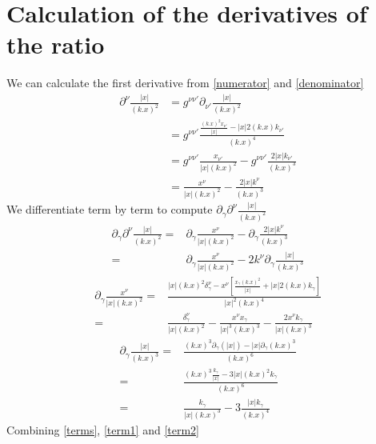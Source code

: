 \documentclass[10pt,a4paper]{article}
\begin{document}
	\section{Calculation of the derivatives of the ratio}
	We can calculate the first derivative from \ref{numerator} and  \ref{denominator}
	\begin{align}
	\partial^{\nu}\frac{\lvert x \rvert}{(k.x)^2} &=g^{\nu\nu'}\partial_{\nu'}\frac{\lvert x \rvert}{(k.x)^2}\\
	&=g^{\nu\nu'}\frac{\frac{(k.x)^{2}x_{\nu'}}{\lvert x \rvert}
		-\lvert x \rvert 2 (k.x)k_{\nu'}}{(k.x)^{4}} \\
	&= g^{\nu\nu'}\frac{x_{\nu'}}{\lvert x \rvert (k.x)^{2}} - g^{\nu\nu'}\frac{2\lvert x \rvert k_{\nu'}}{(k.x)^3} \\
	&= \frac{x^{\nu}}{\lvert x \rvert (k.x)^{2}} - \frac{2\lvert x \rvert k^{\nu}}{(k.x)^3}
	\end{align}
	We differentiate term by term to compute $\partial_{\gamma}\partial^{\nu}\frac{\lvert x \rvert}{(k.x)^{2}}$
	\begin{align}
	\partial_{\gamma}\partial^{\nu}\frac{\lvert x \rvert}{(k.x)^{2}} =&\partial_{\gamma}\frac{x^{\nu}}{\lvert x \rvert (k.x)^{2}} - \partial_{\gamma}\frac{2\lvert x \rvert k^{\nu}}{(k.x)^3}\\
	=&\partial_{\gamma}\frac{x^{\nu}}{\lvert x \rvert (k.x)^{2}} - 2k^{\nu}\partial_{\gamma}\frac{\lvert x \rvert }{(k.x)^3} \label{terms}
	\end{align}
	\begin{align}
		\partial_{\gamma}\frac{x^{\nu}}{\lvert x \rvert (k.x)^{2}}=& \frac{\lvert x \rvert (k.x)^{2}\delta_{\gamma}^{\nu}-x^{\nu}[\frac{x_{\gamma}(k.x)^{2}}{\lvert x \rvert}+ \lvert x \rvert 2 (k.x) k_{\gamma}]}{\lvert x \rvert^{2}(k.x)^{4}}\\
		=&\frac{\delta_{\gamma}^{\nu}}{\lvert x \rvert (k.x)^{2}} -\frac{x^{\nu}x_{\gamma}}{\lvert x \rvert ^{3} (k.x)^3} -\frac{2 x^{\nu} k_{\gamma}}{\lvert x \rvert (k.x)^{3}} \label{term1}
	\end{align}
	\begin{align}
	\partial_{\gamma}\frac{\lvert x \rvert }{(k.x)^3}=& \frac{(k.x)^{3}\partial_{\gamma}(\lvert x \rvert)-\lvert x \rvert  \partial_{\gamma}(k.x)^{3}}{(k.x)^{6}} \\
	=& \frac{(k.x)^{3}\frac{k_{\gamma}}{\lvert x \rvert} -3 \lvert x \rvert (k.x)^{2} k_{\gamma}}{(k.x)^{6}}\\
	=& \frac{k_{\gamma}}{\lvert x \rvert (k.x)^{3}}  - 3\frac{\lvert x \rvert k_{\gamma}}{(k.x)^{4}} \label{term2}
	\end{align}
	Combining \ref{terms}, \ref{term1} and \ref{term2}
	
\end{document}

